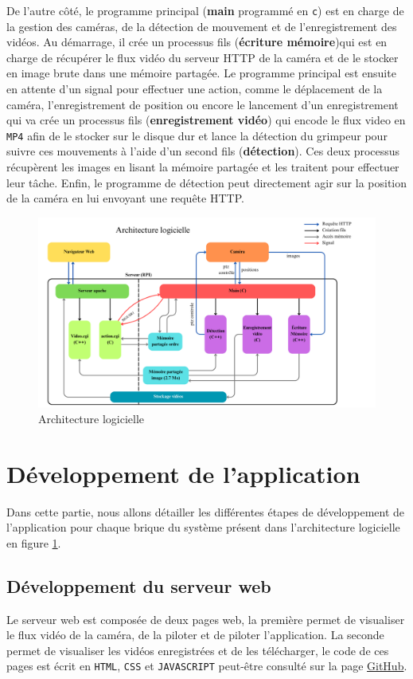 \documentclass[a4paper, 11pt, french]{article}
\begin{document}
De l'autre côté, le programme principal (\textbf{main} programmé en \texttt{c}) est en charge de la gestion des caméras, de la détection de mouvement et de l'enregistrement des vidéos. Au démarrage, il crée un processus fils (\textbf{écriture mémoire})qui est en charge de récupérer le flux vidéo du serveur HTTP de la caméra et de le stocker en image brute dans une mémoire partagée. Le programme principal est ensuite en attente d'un signal pour effectuer une action, comme le déplacement de la caméra, l'enregistrement de position ou encore le lancement d'un enregistrement qui va crée un processus fils (\textbf{enregistrement vidéo}) qui encode le flux video en \texttt{MP4} afin de le stocker sur le disque dur et lance la détection du grimpeur pour suivre ces mouvements à l'aide d'un second fils (\textbf{détection}). Ces deux processus récupèrent les images en lisant la mémoire partagée et les traitent pour effectuer leur tâche. Enfin, le programme de détection peut directement agir sur la position de la caméra en lui envoyant une requête HTTP.


\begin{figure}[!ht]
  \centering
  \includegraphics[width=\textwidth]{architectureLogicielle.png}
  \caption{Architecture logicielle}
  \label{fig:architectureLogicielle}
\end{figure}

\section{Développement de l'application}
Dans cette partie, nous allons détailler les différentes étapes de développement de l'application pour chaque brique du système présent dans l'architecture logicielle en figure \ref{fig:architectureLogicielle}.

\subsection{Développement du serveur web}
Le serveur web est composée de deux pages web, la première permet de visualiser le flux vidéo de la caméra, de la piloter et de piloter l'application. La seconde permet de visualiser les vidéos enregistrées et de les télécharger, le code de ces pages est écrit en \texttt{HTML}, \texttt{CSS} et \texttt{JAVASCRIPT} peut-être consulté sur la page \href{https://github.com/Romaiiin91/suiviGrimpeur_PDI/tree/main/server/html}{GitHub}.
\end{document}
